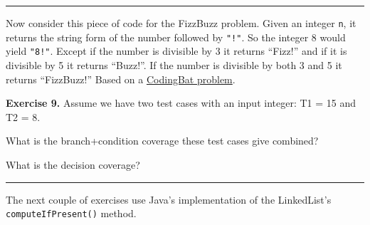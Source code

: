 \begin{center}\rule{0.5\linewidth}{0.5pt}\end{center}

Now consider this piece of code for the FizzBuzz problem. Given an
integer \texttt{n}, it returns the string form of the number followed by
\texttt{"!"}. So the integer 8 would yield \texttt{"8!"}. Except if the
number is divisible by 3 it returns ``Fizz!'' and if it is divisible by
5 it returns ``Buzz!''. If the number is divisible by both 3 and 5 it
returns ``FizzBuzz!'' Based on a
\href{https://codingbat.com/prob/p115243}{CodingBat problem}.

\begin{Shaded}
\begin{Highlighting}[]
  \NormalTok{(}
  \NormalTok{ == }\NormalTok{ == }\NormalTok{)}
        \NormalTok{;}
  \NormalTok{ == }\NormalTok{)}
       \NormalTok{;}
  \NormalTok{ == }\NormalTok{)}
       \NormalTok{;}
  \NormalTok{;}
\NormalTok{\}}
\end{Highlighting}
\end{Shaded}

\textbf{Exercise 9.} Assume we have two test cases with an input
integer: T1 = 15 and T2 = 8.

What is the branch+condition coverage these test cases give combined?

What is the decision coverage?

\begin{center}\rule{0.5\linewidth}{0.5pt}\end{center}

The next couple of exercises use Java's implementation of the
LinkedList's \texttt{computeIfPresent()} method.

